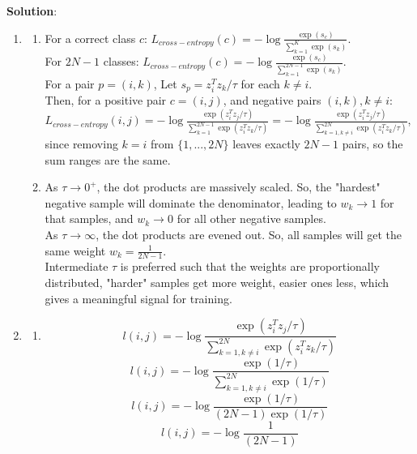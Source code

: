 \documentclass[submit]{../harvardml}
\newenvironment{solution}{%
    \vspace{2mm}\color{blue}\noindent\textbf{Solution}:\ }
{}
\begin{document}
\begin{solution}
	\begin{enumerate}
	    \item 
            \begin{enumerate}
                \item   
                    For a correct class $c$: $L_{cross-entropy}(c) = - \log \frac{\exp(s_c)}{\sum_{k=1}^K\exp(s_k)}$.\\
                    For $2N-1$ classes: $L_{cross-entropy}(c) = - \log \frac{\exp(s_c)}{\sum_{k=1}^{2N-1}\exp(s_k)}$.\\
                    For a pair $p = (i, k)$, Let $s_p = z_i^Tz_k/\tau$ for each $k \neq i$.\\
                    Then, for a positive pair $c = (i, j)$, and negative pairs $(i, k), k\neq i$:\\ $L_{cross-entropy}(i, j) = - \log \frac{\exp(z_i^Tz_j/\tau)}{\sum_{k=1}^{2N-1}\exp(z_i^Tz_k/\tau)} = - \log \frac{\exp(z_i^Tz_j/\tau)}{\sum_{k=1, k\neq i}^{2N}\exp(z_i^Tz_k/\tau)}$,\\
                    since removing $k = i$ from $\{1, ...,2N\}$ leaves exactly $2N-1$ pairs, so the sum ranges are the same.
                \item
                    As $\tau \rightarrow 0^+$, the dot products are massively scaled. So, the "hardest" negative sample will dominate the denominator, leading to $w_k \rightarrow 1$ for that samples, and $w_k \rightarrow 0$ for all other negative samples.\\
                    As $\tau \rightarrow \infty$, the dot products are evened out. So, all samples will get the same weight $w_k = \frac{1}{2N - 1}$.\\
                    Intermediate $\tau$ is preferred such that the weights are proportionally distributed, "harder" samples get more weight, easier ones less, which gives a meaningful signal for training.
            \end{enumerate}
        \item
            \begin{enumerate}
                \item 
                    $$l(i, j) = - \log \frac{\exp(z_i^Tz_j/\tau)}{\sum_{k=1, k\neq i}^{2N}\exp(z_i^Tz_k/\tau)}$$
                    $$l(i, j) = - \log \frac{\exp(1/\tau)}{\sum_{k=1, k\neq i}^{2N}\exp(1/\tau)}$$
                    $$l(i, j) = - \log \frac{\exp(1/\tau)}{(2N-1)\exp(1/\tau)}$$
                    $$l(i, j) = - \log \frac{1}{(2N-1)}$$

\end{enumerate}
\end{enumerate}
\end{solution}
\end{document}
